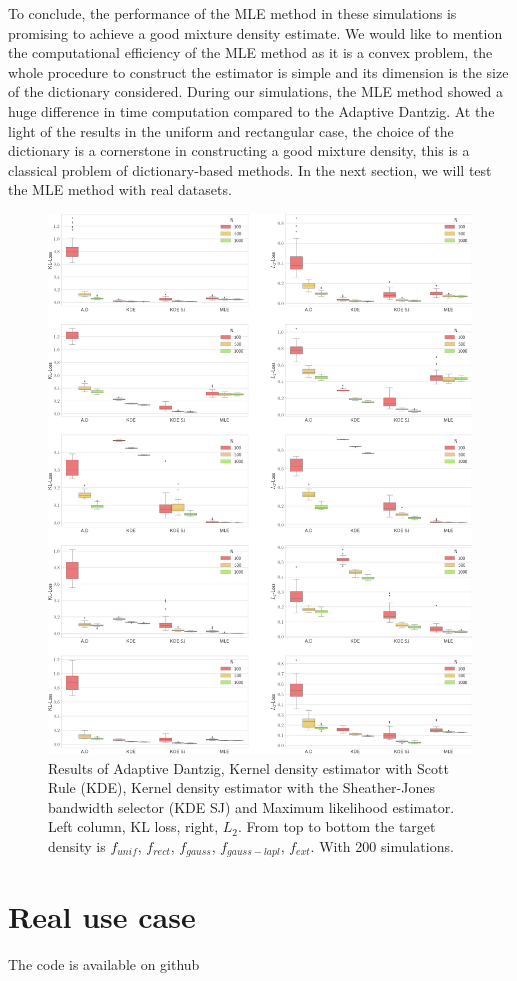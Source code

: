 To conclude, the performance of the MLE method in these simulations is promising to achieve a good mixture density estimate. We would like to mention the computational efficiency of the MLE method as it is a convex problem, the whole procedure to construct the estimator is simple and its dimension is the size of the dictionary considered. During our simulations, the MLE method showed a huge difference in time computation compared to the Adaptive Dantzig. At the light of the results in the uniform and rectangular case, the choice of the dictionary is a cornerstone in constructing a good mixture density, this is a classical problem of dictionary-based methods. In the next section, we will test the MLE method with real datasets.

\begin{figure}[h]
    \hspace{-2cm}
    \includegraphics[width=1.2\textwidth]{./TeX_files/full_results.png}
    \caption{Results of Adaptive Dantzig, Kernel density estimator with Scott Rule (KDE), Kernel density estimator with the Sheather-Jones bandwidth selector (KDE SJ) and Maximum likelihood estimator. Left column, KL loss, right, $L_2$. From top to bottom the target density is $f_{unif}$, $f_{rect}$, $f_{gauss}$, $f_{gauss-lapl}$, $f_{ext}$. With 200 simulations.  }
    \label{fig:full_res}
\end{figure}
\section{Real use case}

The code is available on github